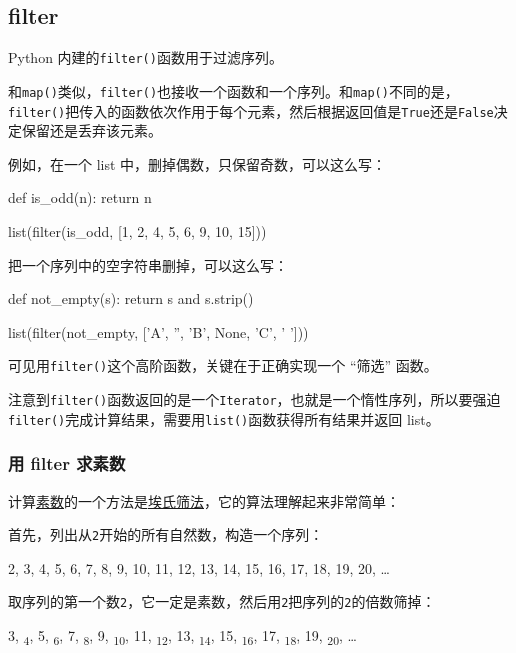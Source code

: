 \hypertarget{filter}{%
\subsection{filter}\label{filter}}

Python 内建的\texttt{filter()}函数用于过滤序列。

和\texttt{map()}类似，\texttt{filter()}也接收一个函数和一个序列。和\texttt{map()}不同的是，\texttt{filter()}把传入的函数依次作用于每个元素，然后根据返回值是\texttt{True}还是\texttt{False}决定保留还是丢弃该元素。

例如，在一个 list 中，删掉偶数，只保留奇数，可以这么写：

\begin{pythoncode}
def is_odd(n):
    return n %

list(filter(is_odd, [1, 2, 4, 5, 6, 9, 10, 15]))
\end{pythoncode}

把一个序列中的空字符串删掉，可以这么写：

\begin{pythoncode}
def not_empty(s):
    return s and s.strip()

list(filter(not_empty, ['A', '', 'B', None, 'C', '  ']))
\end{pythoncode}

可见用\texttt{filter()}这个高阶函数，关键在于正确实现一个 ``筛选''
函数。

注意到\texttt{filter()}函数返回的是一个\texttt{Iterator}，也就是一个惰性序列，所以要强迫\texttt{filter()}完成计算结果，需要用\texttt{list()}函数获得所有结果并返回
list。

\hypertarget{ux7528-filter-ux6c42ux7d20ux6570}{%
\subsubsection{用 filter
求素数}\label{ux7528-filter-ux6c42ux7d20ux6570}}

计算\href{http://baike.baidu.com/view/10626.htm}{素数}的一个方法是\href{http://baike.baidu.com/view/3784258.htm}{埃氏筛法}，它的算法理解起来非常简单：

首先，列出从\texttt{2}开始的所有自然数，构造一个序列：

2, 3, 4, 5, 6, 7, 8, 9, 10, 11, 12, 13, 14, 15, 16, 17, 18, 19, 20,
\ldots{}

取序列的第一个数\texttt{2}，它一定是素数，然后用\texttt{2}把序列的\texttt{2}的倍数筛掉：

3, \textsubscript{4}, 5, \textsubscript{6}, 7, \textsubscript{8}, 9,
\textsubscript{10}, 11, \textsubscript{12}, 13, \textsubscript{14}, 15,
\textsubscript{16}, 17, \textsubscript{18}, 19, \textsubscript{20},
\ldots{}

